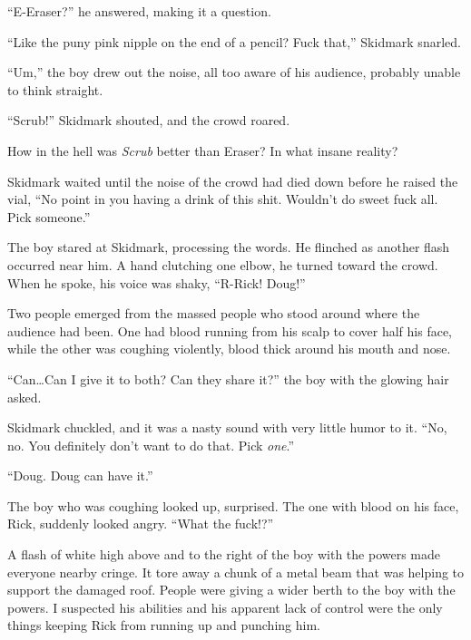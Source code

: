 ``E-Eraser?'' he answered, making it a question.



``Like the puny pink nipple on the end of a pencil?  Fuck that,'' Skidmark snarled.



``Um,'' the boy drew out the noise, all too aware of his audience, probably unable to think straight.



``Scrub!'' Skidmark shouted, and the crowd roared.



How in the hell was\emph{ Scrub }better than Eraser?  In what insane reality?



Skidmark waited until the noise of the crowd had died down before he raised the vial, ``No point in you having a drink of this shit.  Wouldn't do sweet fuck all.  Pick someone.''



The boy stared at Skidmark, processing the words.  He flinched as another flash occurred near him.  A hand clutching one elbow, he turned toward the crowd.  When he spoke, his voice was shaky, ``R-Rick!  Doug!''



Two people emerged from the massed people who stood around where the audience had been.  One had blood running from his scalp to cover half his face, while the other was coughing violently, blood thick around his mouth and nose.



``Can\ldots  Can I give it to both?  Can they share it?'' the boy with the glowing hair asked.



Skidmark chuckled, and it was a nasty sound with very little humor to it.  ``No, no.  You definitely don't want to do that.  Pick \emph{one}.''



``Doug.  Doug can have it.''



The boy who was coughing looked up, surprised.  The one with blood on his face, Rick, suddenly looked angry.  ``What the fuck!?''



A flash of white high above and to the right of the boy with the powers made everyone nearby cringe.  It tore away a chunk of a metal beam that was helping to support the damaged roof.  People were giving a wider berth to the boy with the powers.  I suspected his abilities and his apparent lack of control were the only things keeping Rick from running up and punching him.



